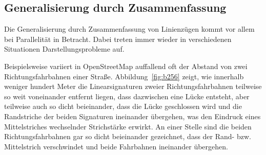 \documentclass[../main/thesis.tex]{subfiles}
\begin{document}
\subsection{Generalisierung durch Zusammenfassung}

	
	


Die Generalisierung durch Zusammenfassung von Linienzügen kommt vor allem bei Parallelität in Betracht.
Dabei treten immer wieder in verschiedenen Situationen Darstellungsprobleme auf.

\label{dual-highway-case-2}

Beispielsweise variiert in OpenStreetMap auffallend oft der Abstand von zwei Richtungsfahrbahnen einer Straße.
Abbildung~\ref{fig:b256} zeigt, wie innerhalb weniger hundert Meter die Linearsignaturen zweier Richtungsfahrbahnen teilweise so weit voneinander entfernt liegen, dass dazwischen eine Lücke entsteht, aber teilweise auch so dicht beieinander, dass die Lücke geschlossen wird und die Randstriche der beiden Signaturen ineinander übergehen, was den Eindruck eines Mittelstriches wechselnder Strichstärke erwirkt.
An einer Stelle sind die beiden Richtungsfahrbahnen gar so dicht beieinander gezeichnet, dass der Rand- bzw. Mittelstrich verschwindet und beide Fahrbahnen ineinander übergehen.
\end{document}
